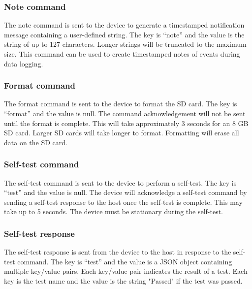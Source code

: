 
\subsubsection{Note command}

The note command is sent to the device to generate a timestamped notification message containing a user-defined string.  The key is \enquote{note} and the value is the string of up to 127 characters.  Longer strings will be truncated to the maximum size.  This command can be used to create timestamped notes of events during data logging.


\subsubsection{Format command}

The format command is sent to the device to format the SD card.  The key is \enquote{format} and the value is null.  The command acknowledgement will not be sent until the format is complete.  This will take approximately 3 seconds for an 8 GB SD card.  Larger SD cards will take longer to format.  Formatting will erase all data on the SD card.


\subsubsection{Self-test command}

The self-test command is sent to the device to perform a self-test.  The key is \enquote{test} and the value is null.  The device will acknowledge a self-test command by sending a self-test response to the host once the self-test is complete.  This may take up to 5 seconds.  The device must be stationary during the self-test.


\subsubsection{Self-test response}

The self-test response is sent from the device to the host in response to the self-test command.  The key is \enquote{test} and the value is a \ac{JSON} object containing multiple key/value pairs.  Each key/value pair indicates the result of a test.  Each key is the test name and the value is the string "Passed" if the test was passed.

